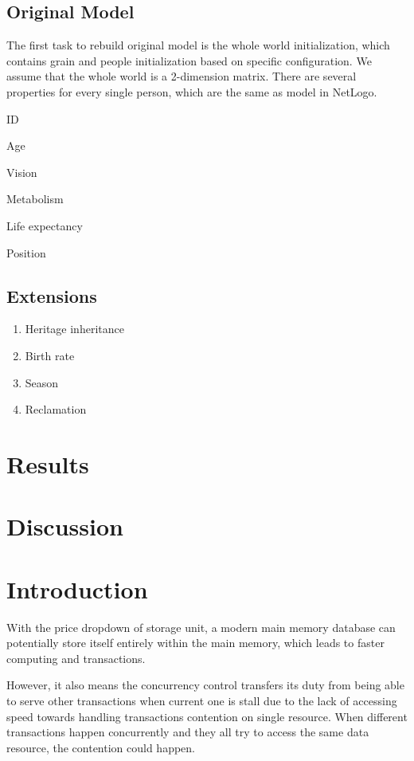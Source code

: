 \subsection{Original Model}
The first task to rebuild original model is the whole world initialization, which contains grain and people initialization based on specific configuration. We assume that the whole world is a 2-dimension matrix. There are several properties for every single person, which are the same as model in NetLogo.
   \begin{AutoMultiColItemize}
   	\item ID
   	\item Age
	\item Vision
	\item Metabolism
	\item Life expectancy
	\item Position
\end{AutoMultiColItemize}

\subsection{Extensions}
\begin{enumerate}
	\item Heritage inheritance
	\item Birth rate
	\item Season
	\item Reclamation
\end{enumerate}
\section{Results}
\section{Discussion}







\newpage
\section{Introduction}

With the price dropdown of storage unit, a modern main memory database can potentially store itself entirely within the main memory, which leads to faster computing and transactions\cite{garcia1992main}.

However, it also means the concurrency control transfers its duty from being able to serve other transactions when current one is stall due to the lack of accessing speed towards handling transactions contention on single resource. When different transactions happen concurrently and they all try to access the same data resource, the contention could happen.

